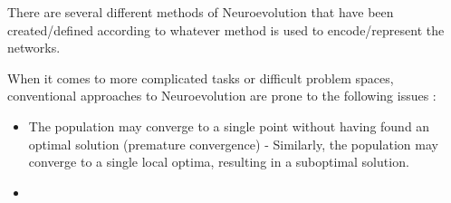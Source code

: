 There are several different methods of Neuroevolution that have been created/defined according to whatever method is used to encode/represent the networks.




When it comes to more complicated tasks or difficult problem spaces, conventional approaches to Neuroevolution are prone to the following issues \cite{Miikkulainen2010}:
\begin{itemize}
	\item The population may converge to a single point without having found an optimal solution (premature convergence) - Similarly, the population may converge to a single local optima, resulting in a suboptimal solution. 
	\item 
\end{itemize}





